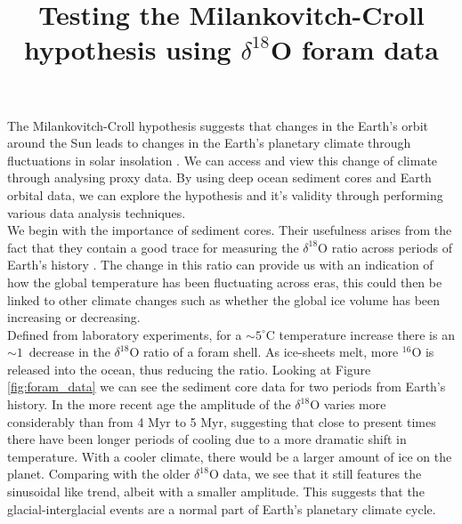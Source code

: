 \documentclass[12pt, onecolumn]{revtex4}    %
\begin{document}
                     

\title{Testing the Milankovitch-Croll hypothesis using $\delta^{18}$O foram data} 
\maketitle

\vspace{-4ex}

The Milankovitch-Croll hypothesis suggests that changes in the Earth's orbit around the Sun leads to changes in the Earth's planetary climate through fluctuations in solar insolation \cite{ruddiman_climate}. We can access and view this change of climate through analysing proxy data. By using deep ocean sediment cores and Earth orbital data, we can explore the hypothesis and it's validity through performing various data analysis techniques. \\

We begin with the importance of sediment cores. Their usefulness arises from the fact that they contain a good trace for measuring the $\delta^{18}$O ratio across periods of Earth's history \cite{droxler_climate}. The change in this ratio can provide us with an indication of how the global temperature has been fluctuating across eras, this could then be linked to other climate changes such as whether the global ice volume has been increasing or decreasing. \\

Defined from laboratory experiments, for a $\sim 5^{\circ}\mathrm{C}$ temperature increase there is an $\sim 1$\textperthousand\ decrease in the $\delta^{18}$O ratio of a foram shell. As ice-sheets melt, more $^{16}$O is released into the ocean, thus reducing the ratio. Looking at Figure \ref{fig:foram_data} we can see the sediment core data for two periods from Earth's history. In the more recent age the amplitude of the $\delta^{18}$O varies more considerably than from 4 Myr to 5 Myr, suggesting that close to present times there have been longer periods of cooling due to a more dramatic shift in temperature. With a cooler climate, there would be a larger amount of ice on the planet. Comparing with the older $\delta^{18}$O data, we see that it still features the sinusoidal like trend, albeit with a smaller amplitude. This suggests that the glacial-interglacial events are a normal part of Earth's planetary climate cycle. \\
\end{document}
